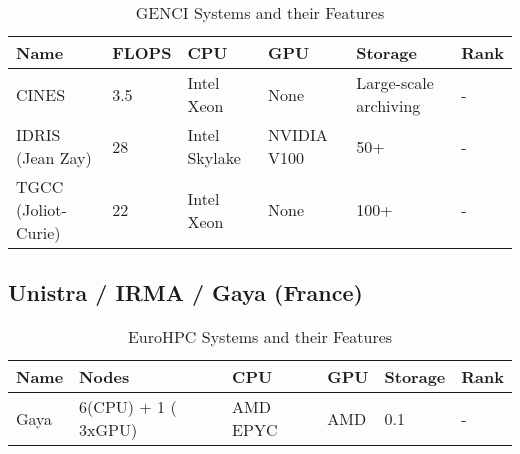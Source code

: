 \begin{table}[!ht]
    \centering
    \begin{tabular}{l l l l l l}
    \toprule
    \textbf{Name} & \textbf{FLOPS} & \textbf{CPU} & \textbf{GPU} & \textbf{Storage} & \textbf{Rank} \\
    \midrule
    CINES & 3.5 & Intel Xeon & None & Large-scale archiving & - \\
    IDRIS (Jean Zay) & 28 & Intel Skylake & NVIDIA V100 & 50+ & - \\
    TGCC (Joliot-Curie) & 22 & Intel Xeon & None & 100+ & - \\
    \bottomrule
    \end{tabular}
    \caption{GENCI Systems and their Features}
    \end{table}

\subsection*{Unistra / IRMA / Gaya (France)}
\label{sec:arch:gaya}

\begin{table}[!ht]
    \centering
    \begin{tabular}{l l l l l l}
    \toprule
    \textbf{Name} & \textbf{Nodes} & \textbf{CPU} & \textbf{GPU} & \textbf{Storage} & \textbf{Rank} \\
    \midrule
    Gaya &  6(CPU) + 1 ( 3xGPU) & AMD EPYC & AMD & 0.1  & - \\
    \bottomrule
    \end{tabular}
    \caption{EuroHPC Systems and their Features}
    \end{table}


